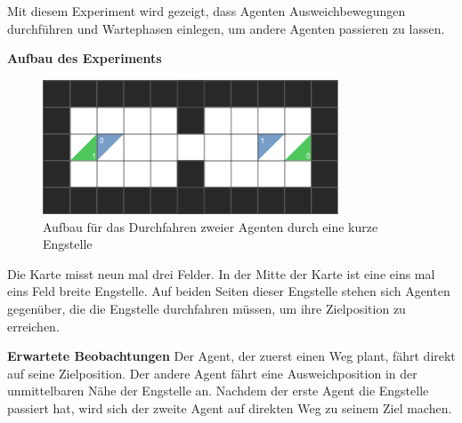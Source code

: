 Mit diesem Experiment wird gezeigt, dass Agenten Ausweichbewegungen durchführen und Wartephasen einlegen, um andere Agenten passieren zu lassen.

\textbf{Aufbau des Experiments}
\begin{figure}[H]
    \includegraphics[height=40mm]{images/one_slit.png}
    \centering
    \caption{Aufbau für das Durchfahren zweier Agenten durch eine kurze Engstelle}
    \label{fig:engstelle}
\end{figure}
Die Karte misst neun mal drei Felder. In der Mitte der Karte ist eine eins mal eins Feld breite Engstelle. Auf beiden Seiten dieser Engstelle stehen sich Agenten gegenüber, die die Engstelle durchfahren müssen, um ihre Zielposition zu erreichen.

\textbf{Erwartete Beobachtungen}\newline
Der Agent, der zuerst einen Weg plant, fährt direkt auf seine Zielposition. Der andere Agent fährt eine Ausweichposition in der unmittelbaren Nähe der Engstelle an. Nachdem der erste Agent die Engstelle passiert hat, wird sich der zweite Agent auf direkten Weg zu seinem Ziel machen.